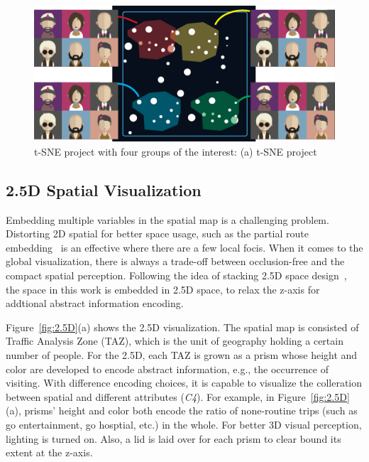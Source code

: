 \begin{figure}[htb!]
 \centering %
 \includegraphics[width=\columnwidth]{pictures/mds}
 \caption{t-SNE project with four groups of the interest: (a) t-SNE project }
 \label{fig:tsne}
\end{figure}

\subsection{2.5D Spatial Visualization}


Embedding multiple variables in the spatial map is a challenging problem. Distorting 2D spatial for better space usage, such as the partial route embedding~\cite{sun2016embedding} is an effective where there are a few local focis. When it comes to the global visualization, there is always a trade-off between occlusion-free and the compact spatial perception. Following the idea of stacking 2.5D space design~\cite{Tominski2012_stacking}, the space in this work is embedded in 2.5D space, to relax the z-axis for addtional abstract information encoding.

Figure~\ref{fig:2.5D}(a) shows the 2.5D visualization. The spatial map is consisted of Traffic Analysis Zone (TAZ), which is the unit of geography holding a certain number of people. For the 2.5D, each TAZ is grown as a prism whose height and color are developed to encode abstract information, e.g., the occurrence of visiting. With difference encoding choices, it is capable to visualize the colleration between spatial and different attributes (\textit{C4}). For example, in Figure~\ref{fig:2.5D}(a), prisms' height and color both encode the ratio of none-routine trips (such as go entertainment, go hosptial, etc.) in the whole. For better 3D visual perception, lighting is turned on. Also, a lid is laid over for each prism to clear bound its extent at the z-axis.   

